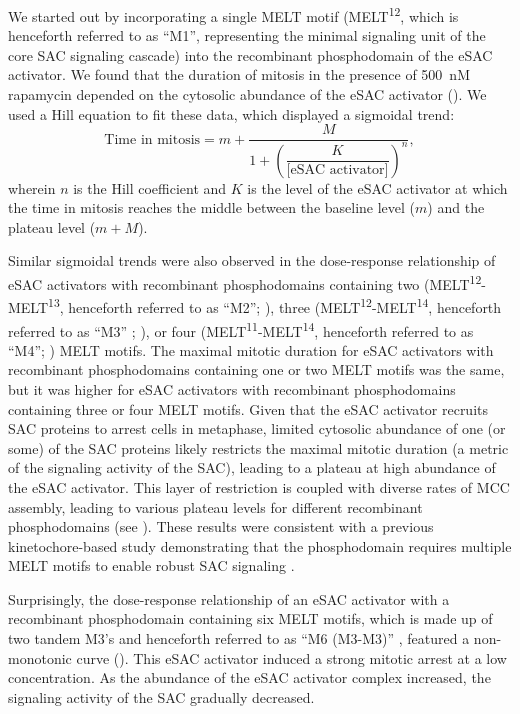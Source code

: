 We started out by incorporating a single MELT motif (MELT\textsuperscript{12}, which is henceforth referred to as ``M1'', representing the minimal signaling unit of the core SAC signaling cascade) into the recombinant phosphodomain of the eSAC activator. We found that the duration of mitosis in the presence of \SI{500}{nM} rapamycin depended on the cytosolic abundance of the eSAC activator (). We used a Hill equation to fit these data, which displayed a sigmoidal trend:
\begin{equation*}
    \text{Time in mitosis} = m + \dfrac{M}{1+(\dfrac{K}{\text{[eSAC activator]}})^n},
\end{equation*}
wherein $n$ is the Hill coefficient and $K$ is the level of the eSAC activator at which the time in mitosis reaches the middle between the baseline level ($m$) and the plateau level ($m+M$).

Similar sigmoidal trends were also observed in the dose-response relationship of eSAC activators with recombinant phosphodomains containing two (MELT\textsuperscript{12}-MELT\textsuperscript{13}, henceforth referred to as ``M2''; ), three (MELT\textsuperscript{12}-MELT\textsuperscript{14}, henceforth referred to as ``M3'' \cite{RecombinantKNL1}; ), or four (MELT\textsuperscript{11}-MELT\textsuperscript{14}, henceforth referred to as ``M4''; ) MELT motifs. The maximal mitotic duration for eSAC activators with recombinant phosphodomains containing one or two MELT motifs was the same, but it was higher for eSAC activators with recombinant phosphodomains containing three or four MELT motifs. Given that the eSAC activator recruits SAC proteins to arrest cells in metaphase, limited cytosolic abundance of one (or some) of the SAC proteins likely restricts the maximal mitotic duration (a metric of the signaling activity of the SAC), leading to a plateau at high abundance of the eSAC activator. This layer of restriction is coupled with diverse rates of MCC assembly, leading to various plateau levels for different recombinant phosphodomains (see ). These results were consistent with a previous kinetochore-based study demonstrating that the  phosphodomain requires multiple MELT motifs to enable robust SAC signaling \cite{RecombinantKNL1}.

Surprisingly, the dose-response relationship of an eSAC activator with a recombinant phosphodomain containing six MELT motifs, which is made up of two tandem M3's and henceforth referred to as ``M6 (M3-M3)'' \cite{RecombinantKNL1}, featured a non-monotonic curve (). This eSAC activator induced a strong mitotic arrest at a low concentration. As the abundance of the eSAC activator complex increased, the signaling activity of the SAC gradually decreased.


